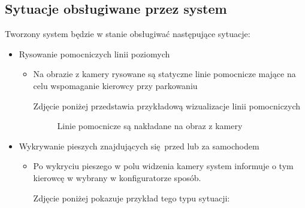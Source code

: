 \subsection{Sytuacje obsługiwane przez system}

Tworzony system będzie w stanie obsługiwać następujące sytuacje:

\begin{itemize}
	\item Rysowanie pomocniczych linii poziomych
	\begin{itemize}
		\item Na obrazie z kamery rysowane są statyczne linie pomocnicze mające na celu wspomaganie kierowcy przy parkowaniu
		
		\begin{center}
			Zdjęcie poniżej przedstawia przykładową wizualizacje linii pomocniczych
		\end{center}
		
		\begin{figure}[H]
			\centering
			\caption{Linie pomocnicze są nakładane na obraz z kamery}
			\label{fig:linie}
		\end{figure}
	\end{itemize}
	\newpage
	\item Wykrywanie pieszych znajdujących się przed lub za samochodem
	\begin{itemize}
		\item Po wykryciu pieszego w polu widzenia kamery system informuje o tym kierowcę w wybrany w konfiguratorze sposób. \newline
		\begin{center}
			Zdjęcie poniżej pokazuje przykład tego typu sytuacji:
		\end{center}


\end{itemize}
\end{itemize}
